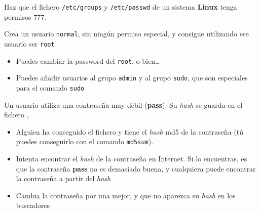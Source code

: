 \begin{homeworkProblem}

  \begin{multicols}{2}

    \null \vfill
    \begin{Actividad}
      Haz que el fichero \texttt{/etc/groups} y \texttt{/etc/passwd} de un sistema \textbf{Linux} tenga permisos 777.  
    \end{Actividad}
    \vfill \null
    \columnbreak


    \begin{Actividad}
      Crea un usuario \texttt{normal}, sin ningún permiso especial, y consigue utilizando ese usuario ser \texttt{root}

      \begin{itemize}
      \item Puedes cambiar la password del \texttt{root}, o bien…
      \item Puedes añadir usuarios al grupo \texttt{admin} y al grupo \texttt{sudo}, que son especiales para el comando \texttt{sudo}
      \end{itemize}
    \end{Actividad}


  \end{multicols}


\end{homeworkProblem}


\begin{homeworkProblem}

    \begin{multicols}{2}

    \null \vfill
    \begin{Actividad}
      Un usuario utiliza una contraseña muy débil (\textbf{pass}). Su \textit{hash} se guarda en el fichero ,
    \end{Actividad}
    \vfill \null
    \columnbreak


    \begin{Actividad}
      \begin{itemize}
      \item Alguien ha conseguido el fichero  y tiene el \textit{hash} md5 de la contraseña (tú puedes        conseguirlo con el comando \texttt{md5sum}).  
      \item Intenta encontrar el \textit{hash} de la contraseña en
        Internet. Si lo encuentras, es que la contraseña \textbf{pass} no es demasiado buena, y cualquiera puede        encontrar la contraseña a partir del \textit{hash} 
      \item Cambia la contraseña por una mejor, y que no aparezca su        \textit{hash} en los buscadores

    \end{itemize}
    \end{Actividad}
  \end{multicols}

\end{homeworkProblem}

